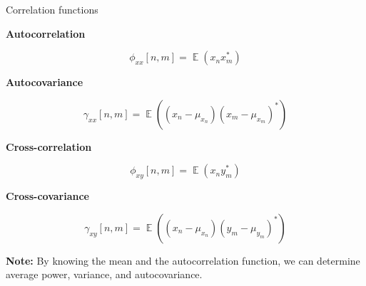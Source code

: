\documentclass[10pt]{beamer}
\DeclareMathOperator{\E}{\mathbb{E}} %
\begin{document}
\begin{frame}{Correlation functions}

\textbf{Autocorrelation}

\begin{equation*}
\phi_{xx}[n, m] = \E(x_nx_m^*) 
\end{equation*}

\textbf{Autocovariance}

\begin{equation*}
\gamma_{xx}[n, m] = \E((x_n-\mu_{x_n})(x_m - \mu_{x_m})^*) 
\end{equation*}

\textbf{Cross-correlation}

\begin{equation*}
\phi_{xy}[n, m] = \E(x_ny_m^*) 
\end{equation*}

\textbf{Cross-covariance}

\begin{equation*}
\gamma_{xy}[n, m] = \E((x_n-\mu_{x_n})(y_m - \mu_{y_m})^*) 
\end{equation*}

\textbf{Note:} By knowing the mean and the autocorrelation function, we can determine average power, variance, and autocovariance.

\end{frame}
\end{document}
